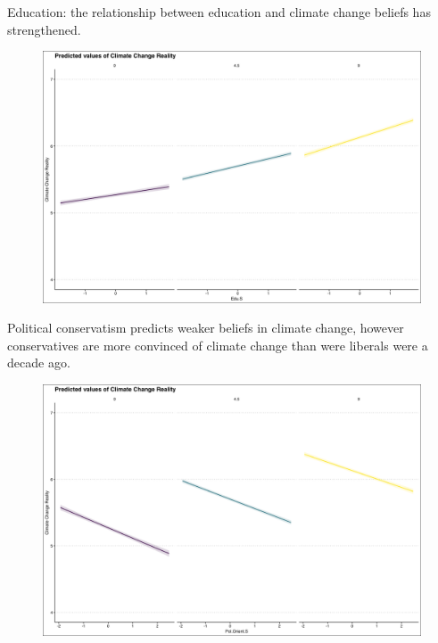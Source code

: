 \documentclass{beamer}
\begin{document}
\begin{frame}{Education: the relationship between education and climate change beliefs has strengthened.}
\begin{figure}
\includegraphics[width=.8\textwidth,height=\textheight,keepaspectratio]{Figures/REAL_Edu.S.png}
\end{figure}
\end{frame}

\begin{frame}{Political conservatism predicts weaker beliefs in climate change, however conservatives are more convinced of climate change than were liberals were a decade ago.}
\begin{figure}
\includegraphics[width=.8\textwidth,height=\textheight,keepaspectratio]{Figures/REAL_Pol.Orient.S.png}
\end{figure}
\end{frame}
\end{document}
